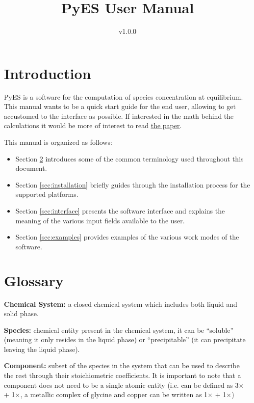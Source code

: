 \documentclass[a4paper, 12pt]{article}
\title{PyES User Manual}
\date{v1.0.0}
\begin{document}
\maketitle

\tableofcontents

\clearpage
\newpage

\section{Introduction}
PyES is a software for the computation of species concentration at equilibrium.
This manual wants to be a quick start guide for the end user, allowing to get accustomed to the interface as possible.
If interested in the math behind the calculations it would be more of interest to read \href{https://papers.ssrn.com/sol3/papers.cfm?abstract_id=4375932}{\underline{the paper}}.


This manual is organized as follows:
\begin{itemize}[\textbullet]
    \item Section \ref*{sec:glossary} introduces some of the common terminology used throughout this document.
    \item Section \ref*{sec:installation} briefly guides through the installation process for the supported platforms.
    \item Section \ref*{sec:interface} presents the software interface and explains the meaning of the various input fields available to the user.
    \item Section \ref*{sec:examples} provides examples of the various work modes of the software.
\end{itemize}

\newpage

\section{Glossary}
\label{sec:glossary}
\textbf{Chemical System:} a closed chemical system which includes both liquid and solid phase.

\textbf{Species:} chemical entity present in the chemical system, it can be ``soluble'' (meaning it only resides in the liquid phase) or ``precipitable'' (it can precipitate leaving the liquid phase).

\textbf{Component:} subset of the species in the system that can be used to describe the rest through their  stoichiometric coefficients.
It is important to note that a component does not need to be a single atomic entity (i.e.  can be defined as  3$\times$ + 1$\times$, a metallic complex of glycine and copper can be written as  1$\times$ + 1$\times$)
\end{document}
